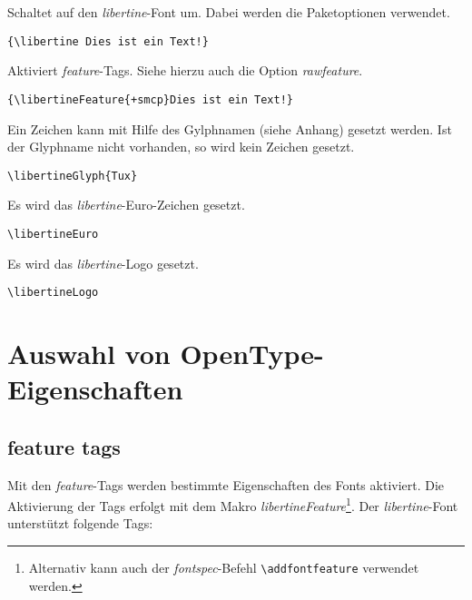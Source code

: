 \documentclass{fontdoku}
\begin{document}
\begin{description}[\setleftmargin{1em}\breaklabel]
\item [\textbackslash libertine]
      Schaltet auf den \emph{libertine}-Font um. Dabei werden die Paketoptionen verwendet.
\begin{lstlisting}
{\libertine Dies ist ein Text!}
\end{lstlisting}

\item [\textbackslash libertineFeature]
      Aktiviert \emph{feature}-Tags. Siehe hierzu auch die Option \emph{rawfeature}.
\begin{lstlisting}
{\libertineFeature{+smcp}Dies ist ein Text!}
\end{lstlisting}

\item [\textbackslash libertineGlyph]
      Ein Zeichen kann mit Hilfe des Gylphnamen (siehe Anhang) gesetzt werden. Ist der Glyphname
      nicht vorhanden, so wird kein Zeichen gesetzt.
\begin{lstlisting}
\libertineGlyph{Tux}
\end{lstlisting}

\item [\textbackslash libertineEuro]
      Es wird das \emph{libertine}-Euro-Zeichen gesetzt.
\begin{lstlisting}
\libertineEuro
\end{lstlisting}

\item [\textbackslash libertineLogo]
      Es wird das \emph{libertine}-Logo gesetzt.
\begin{lstlisting}
\libertineLogo
\end{lstlisting}
\end{description}


\newpage
\section{Auswahl von OpenType-Eigenschaften}

\subsection{feature tags}

Mit den \emph{feature}-Tags werden bestimmte Eigenschaften des Fonts aktiviert.
Die Aktivierung der Tags erfolgt mit dem Makro \emph{libertineFeature}\footnote{Alternativ kann auch der \emph{fontspec}-Befehl \texttt{\textbackslash addfontfeature} verwendet werden.}.
Der \emph{libertine}-Font unterstützt folgende Tags:%
\end{document}
